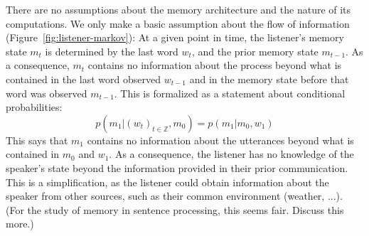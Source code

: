 \documentclass[11pt,letterpaper]{article}
\newcommand\mhahn[1]{{\color{red}(#1)}}
\begin{document}
There are no assumptions about the memory architecture and the nature of its computations.
We only make a basic assumption about the flow of information (Figure~\ref{fig:listener-markov}):
At a given point in time, the listener's memory state $m_t$ is determined by the last word $w_t$, and the prior memory state $m_{t-1}$.
As a consequence, $m_t$ contains no information about the process beyond what is contained in the last word observed $w_{t-1}$ and in the memory state before that word was observed $m_{t-1}$.
This is formalized as a statement about conditional probabilities:
	\begin{equation}\label{eq:listener-markov}
		p(m_1| (w_{t})_{t \in \mathbb{Z}}, m_0)   = p(m_1 | m_0, w_1)
	\end{equation}
This says that $m_1$ contains no information about the utterances beyond what is contained in $m_0$ and $w_1$.	
As a consequence, the listener has no knowledge of the speaker's state beyond the information provided in their prior communication.
This is a simplification, as the listener could obtain information about the speaker from other sources, such as their common environment (weather, ...).
\mhahn{For the study of memory in sentence processing, this seems fair. Discuss this more.}

%
%

\end{document}
